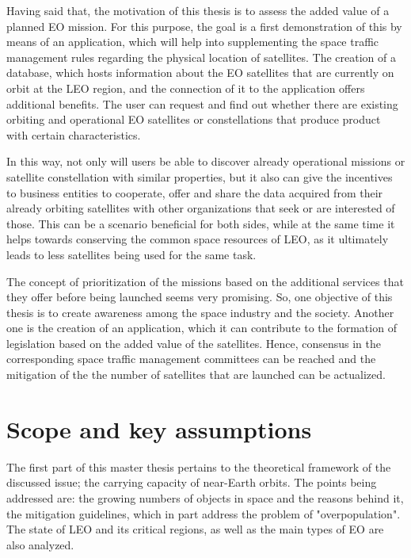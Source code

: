 Having said that, the motivation of this thesis is to assess the added value of a planned EO mission. For this purpose, the goal is a first demonstration of this by means of an application, which will help into supplementing the space traffic management rules regarding the physical location of satellites. The creation of a database, which hosts information about the EO satellites that are currently on orbit at the LEO region, and the connection of it to the application offers additional benefits. The user can request and find out whether there are existing orbiting and operational EO satellites or constellations that produce product with certain characteristics.

In this way, not only will users be able to discover already operational missions or satellite constellation with similar properties, %
but it also can give the incentives to business entities %
to cooperate, offer and share the data acquired from their already orbiting satellites with other organizations that seek or are interested of those. This can be a scenario beneficial for both sides, while at the same time it helps towards conserving the common space resources of LEO, as it ultimately leads to less satellites being used for the same task.

The concept of prioritization of the missions based on the additional services that they offer before being launched seems very promising. So, one objective of this thesis is to create awareness among the space industry and the society. Another one is the creation of an application, which it can contribute to the formation of legislation based on the added value of the satellites. Hence, consensus in the corresponding space traffic management committees can be reached and the mitigation of the the number of satellites that are launched can be actualized.

\bigskip
\bigskip

\newpage
\section{Scope and key assumptions}
\label{chap:scope}
\bigskip


The first part of this master thesis pertains to the theoretical framework of the discussed issue; the carrying capacity of near-Earth orbits. The points being addressed are: the growing numbers of objects in space and the reasons behind it, the mitigation guidelines, which in part address the problem of "overpopulation". The state of LEO and its critical regions, as well as the main types of EO are also analyzed.

